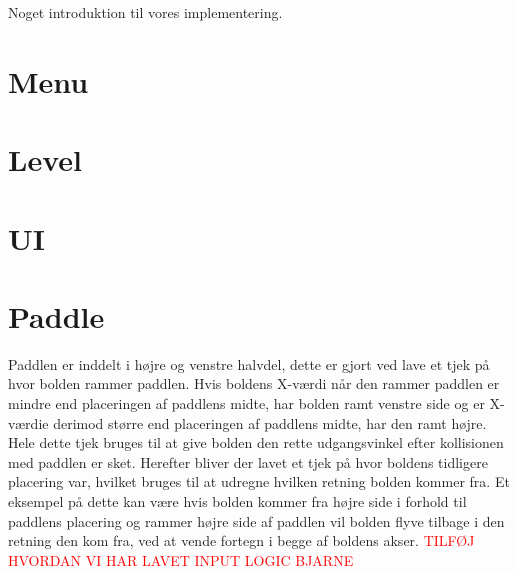 Noget introduktion til vores implementering.

\section{Menu}


\section{Level}


\section{UI}


\section{Paddle}
Paddlen er inddelt i højre og venstre halvdel, dette er gjort ved lave et tjek på hvor bolden rammer paddlen. Hvis boldens X-værdi når den rammer paddlen er mindre end placeringen af paddlens midte, har bolden ramt venstre side og er X-værdie derimod større end placeringen af paddlens midte, har den ramt højre. Hele dette tjek bruges til at give bolden den rette udgangsvinkel efter kollisionen med paddlen er sket. Herefter bliver der lavet et tjek på hvor boldens tidligere placering var, hvilket bruges til at udregne hvilken retning bolden kommer fra. Et eksempel på dette kan være hvis bolden kommer fra højre side i forhold til paddlens placering og rammer højre side af paddlen vil bolden flyve tilbage i den retning den kom fra, ved at vende fortegn i begge af boldens akser.\newline
 \textcolor{red}{TILFØJ HVORDAN VI HAR LAVET INPUT LOGIC BJARNE }

